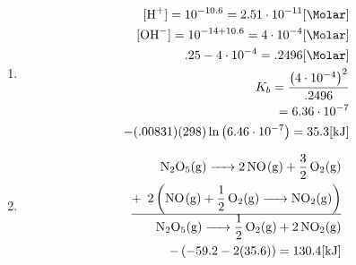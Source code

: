 \documentclass[12pt]{article}
\begin{document}
\begin{enumerate}
  \item

    \begin{equation}
      \begin{split}
        [\ce{H+}]=10^{-10.6}=2.51\cdot10^{-11}[\si{\Molar}]\\
        [\ce{OH-}]=10^{-14+10.6}=4\cdot10^{-4}[\si{\Molar}]\\
        .25-4\cdot10^{-4}=.2496[\si{\Molar}]\\
        K_b=\frac{\left( 4\cdot10^{-4} \right)^2}{.2496}\\
        =6.36\cdot10^{-7}\\
        -(.00831)(298)\ln\left( 6.46\cdot10^{-7} \right)=35.3[\si{\kilo\joule}]
      \end{split}
      \label{3}
    \end{equation}

    \setcounter{enumi}{71}

  \item

    \begin{equation}
      \begin{split}
        \ce{N2O5(g) -> 2NO(g) + 3/2O2(g)} \\
        +\,\,\,2\left( \ce{NO(g) + 1/2O2(g) -> NO2(g)} \right)\\
        \hline
        \ce{N2O5(g) -> 1/2O2(g) + 2NO2(g)}\\
        -\left( -59.2-2(35.6) \right)=130.4[\si{\kilo\joule}]
      \end{split}
      \label{4}
    \end{equation}

\end{enumerate}
\end{document}
